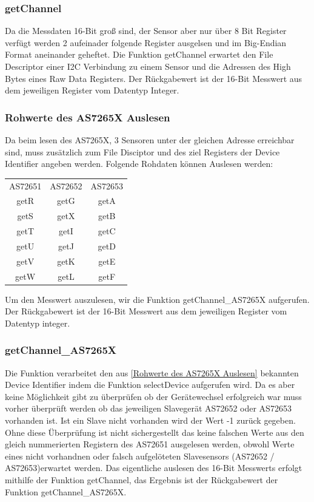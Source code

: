 \subsubsection{getChannel}
Da die Messdaten 16-Bit groß sind, der Sensor aber nur über 8 Bit Register verfügt werden 2 aufeinader folgende Register ausgelsen und im Big-Endian Format aneinander geheftet.
Die Funktion getChannel erwartet den File Descriptor einer I2C Verbindung zu einem Sensor und die Adressen des High Bytes eines Raw Data Registers.
Der Rückgabewert ist der 16-Bit Messwert aus dem jeweiligen Register vom Datentyp Integer.
\subsubsection{Rohwerte des AS7265X Auslesen}
Da beim lesen des AS7265X, 3 Sensoren unter der gleichen Adresse erreichbar sind, muss zusätzlich zum File Disciptor und des ziel Registers der Device Identifier angeben werden.
Folgende Rohdaten können Auslesen werden:
\begin{center}
\begin{tabular}{ c c c }
 	AS72651 & AS72652 & AS72653 \\ 
 	getR & getG & getA \\  
 	getS & getX & getB \\
 	getT & getI & getC \\  
 	getU & getJ & getD \\
 	getV & getK & getE \\  
 	getW & getL & getF \\
\end{tabular}
\end{center}
Um den Messwert auszulesen, wir die Funktion getChannel\_AS7265X aufgerufen.\\
Der Rückgabewert ist der 16-Bit Messwert aus dem jeweiligen Register vom Datentyp integer.

\subsubsection{getChannel\_AS7265X}
Die Funktion verarbeitet den aus \ref{Rohwerte des AS7265X Auslesen} bekannten Device Identifier indem die Funktion selectDevice aufgerufen wird.
	Da es aber keine Möglichkeit gibt zu überprüfen ob der Gerätewechsel erfolgreich war muss vorher überprüft werden ob das jeweiligen Slavegerät AS72652 oder AS72653 vorhanden ist.
	Ist ein Slave nicht vorhanden wird der Wert -1 zurück gegeben.
	Ohne diese Überprüfung ist nicht sichergestellt das keine falschen Werte aus den gleich nummerierten Registern des AS72651 ausgelesen werden, obwohl Werte eines nicht vorhandnen oder falsch aufgelöteten Slavesensors (AS72652 / AS72653)erwartet werden.
	Das eigentliche auslesen des 16-Bit Messwerts erfolgt mithilfe der Funktion getChannel, das Ergebnis ist der Rückgabewert der Funktion getChannel\_AS7265X.

